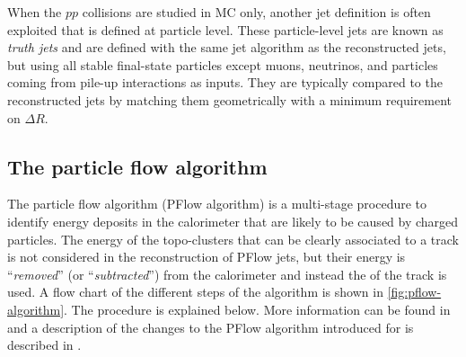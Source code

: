 
When the $pp$ collisions are studied in MC only, another jet definition is often exploited that is defined at particle level. These particle-level jets are known as \emph{truth jets} and are defined with the same jet algorithm as the reconstructed jets, but using all stable final-state particles except muons, neutrinos, and particles coming from pile-up interactions as inputs. They are typically compared to the reconstructed jets by matching them geometrically with a minimum requirement on $\Delta R$. 




\subsection{The particle flow algorithm}
\label{subsec:pflow-algorithm}
The particle flow algorithm (PFlow algorithm) is a multi-stage procedure to identify energy deposits in the calorimeter that are likely to be caused by charged particles. The energy of the topo-clusters that can be clearly associated to a track is not considered in the reconstruction of PFlow jets, but their energy is ``\emph{removed}'' (or ``\emph{subtracted}'') from the calorimeter and instead the \pT of the track is used. A flow chart of the different steps of the algorithm is shown in \cref{fig:pflow-algorithm}. The procedure is explained below. More information can be found in  and a description of the changes to the PFlow algorithm introduced for \RunTwo is described in .


